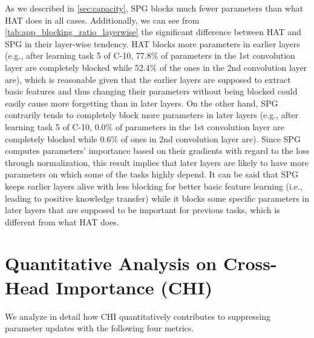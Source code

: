 As we described in \cref{sec:capacity}, SPG blocks much fewer parameters than what HAT does in all cases.
Additionally, we can see from \cref{tab:app_blocking_ratio_layerwise} the significant difference between HAT and SPG in their layer-wise tendency. 
HAT blocks more parameters in earlier layers (e.g., after learning task 5 of C-10, 77.8\% of parameters in the 1st convolution layer are completely blocked while 52.4\% of the ones in the 2nd convolution layer are), which is reasonable given that the earlier layers are supposed to extract basic features and thus changing their parameters without being blocked could easily cause more forgetting than in later layers. 
On the other hand, SPG contrarily tends to completely block more parameters in later layers (e.g., after learning task 5 of C-10, 0.0\% of parameters in the 1st convolution layer are completely blocked while 0.6\% of ones in 2nd convolution layer are). Since SPG computes parameters' importance based on their gradients with regard to the loss through normalization, this result implies that later layers are likely to have more parameters on which some of the tasks highly depend. It can be said that SPG keeps earlier layers alive with less blocking for better basic feature learning (i.e., leading to positive knowledge transfer) while it blocks some specific parameters in later layers that are supposed to be important for previous tasks, which is different from what HAT does. 





\newpage







\section{Quantitative Analysis on Cross-Head Importance (CHI)} \label{sec:app_chi}

We analyze in detail how CHI quantitatively contributes to suppressing parameter updates with the following four metrics.

